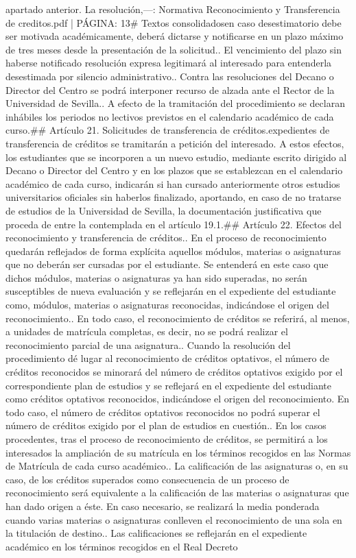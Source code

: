 \documentclass{article}
\begin{document}
\begin{itemize}
apartado anterior. La resolución,\n\n---\n\nFUENTE: Normativa Reconocimiento y Transferencia de creditos.pdf | PÁGINA: 13\n# Textos consolidados\n\nque en caso desestimatorio debe ser motivada académicamente, deberá dictarse y notificarse en un plazo máximo de tres meses desde la presentación de la solicitud.\n{}. El vencimiento del plazo sin haberse notificado resolución expresa legitimará al interesado para entenderla desestimada por silencio administrativo.\n{}. Contra las resoluciones del Decano o Director del Centro se podrá interponer recurso de alzada ante el Rector de la Universidad de Sevilla.\n{}. A efecto de la tramitación del procedimiento se declaran inhábiles los periodos no lectivos previstos en el calendario académico de cada curso.\n\n## Artículo 21. Solicitudes de transferencia de créditos.\n\nLos expedientes de transferencia de créditos se tramitarán a petición del interesado. A estos efectos, los estudiantes que se incorporen a un nuevo estudio, mediante escrito dirigido al Decano o Director del Centro y en los plazos que se establezcan en el calendario académico de cada curso, indicarán si han cursado anteriormente otros estudios universitarios oficiales sin haberlos finalizado, aportando, en caso de no tratarse de estudios de la Universidad de Sevilla, la documentación justificativa que proceda de entre la contemplada en el artículo 19.1.\n\n## Artículo 22. Efectos del reconocimiento y transferencia de créditos.\n{}. En el proceso de reconocimiento quedarán reflejados de forma explícita aquellos módulos, materias o asignaturas que no deberán ser cursadas por el estudiante. Se entenderá en este caso que dichos módulos, materias o asignaturas ya han sido superadas, no serán susceptibles de nueva evaluación y se reflejarán en el expediente del estudiante como, módulos, materias o asignaturas reconocidas, indicándose el origen del reconocimiento.\n{}. En todo caso, el reconocimiento de créditos se referirá, al menos, a unidades de matrícula completas, es decir, no se podrá realizar el reconocimiento parcial de una asignatura.\n{}. Cuando la resolución del procedimiento dé lugar al reconocimiento de créditos optativos, el número de créditos reconocidos se minorará del número de créditos optativos exigido por el correspondiente plan de estudios y se reflejará en el expediente del estudiante como créditos optativos reconocidos, indicándose el origen del reconocimiento. En todo caso, el número de créditos optativos reconocidos no podrá superar el número de créditos exigido por el plan de estudios en cuestión.\n{}. En los casos procedentes, tras el proceso de reconocimiento de créditos, se permitirá a los interesados la ampliación de su matrícula en los términos recogidos en las Normas de Matrícula de cada curso académico.\n{}. La calificación de las asignaturas o, en su caso, de los créditos superados como consecuencia de un proceso de reconocimiento será equivalente a la calificación de las materias o asignaturas que han dado origen a éste. En caso necesario, se realizará la media ponderada cuando varias materias o asignaturas conlleven el reconocimiento de una sola en la titulación de destino.\n{}. Las calificaciones se reflejarán en el expediente académico en los términos recogidos en el Real Decreto 
\end{itemize}
\end{document}
